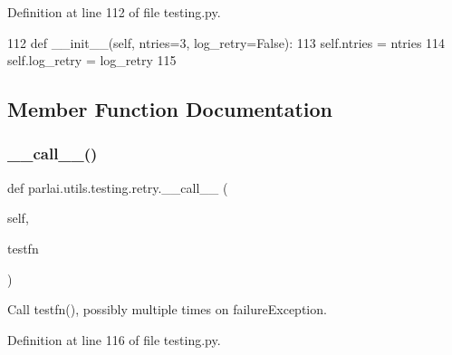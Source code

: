 Definition at line 112 of file testing.\+py.


\begin{DoxyCode}
112     \textcolor{keyword}{def }\_\_init\_\_(self, ntries=3, log\_retry=False):
113         self.ntries = ntries
114         self.log\_retry = log\_retry
115 
\end{DoxyCode}


\subsection{Member Function Documentation}
\mbox{\label{classparlai_1_1utils_1_1testing_1_1retry_ac034808bb9ab13c8f8314d7069c6325e}} 
\subsubsection{\texorpdfstring{\+\_\+\+\_\+call\+\_\+\+\_\+()}{\_\_call\_\_()}}
{\footnotesize\ttfamily def parlai.\+utils.\+testing.\+retry.\+\_\+\+\_\+call\+\_\+\+\_\+ (\begin{DoxyParamCaption}\item[{}]{self,  }\item[{}]{testfn }\end{DoxyParamCaption})}

\begin{DoxyVerb}Call testfn(), possibly multiple times on failureException.
\end{DoxyVerb}
 

Definition at line 116 of file testing.\+py.


